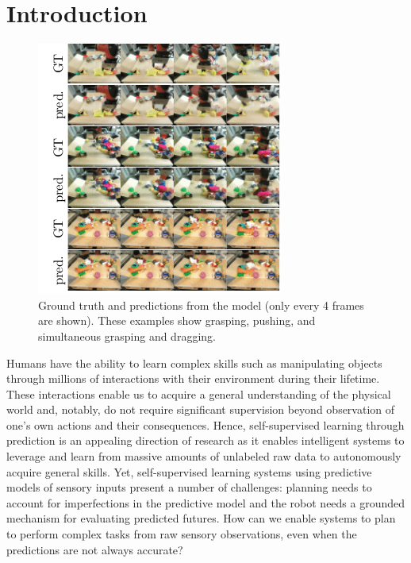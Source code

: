 \section{Introduction}

\begin{figure}
\vspace{-5mm}
\centering
\includegraphics[width=0.4\columnwidth,trim={3.2mm 0 0 0},clip]{images/video_prediction}
\caption{\small{Ground truth and predictions from the model (only every 4 frames are shown). These examples show grasping, pushing, and simultaneous grasping and dragging. }}
\label{fig:video_prediction}
\vspace{-0.2in}
\end{figure}

Humans have the ability to learn complex skills such as manipulating objects through millions of interactions with their environment during their lifetime.
These interactions enable us to acquire a general understanding of the physical world and, notably, do not require significant supervision beyond observation of one's own actions and their consequences. Hence, self-supervised learning through prediction is an appealing direction of research as it enables intelligent systems to leverage and learn from massive amounts of unlabeled raw data to autonomously acquire general skills. Yet, self-supervised learning systems using predictive models of sensory inputs present a number of challenges: planning needs to account for imperfections in the predictive model and the robot needs a grounded mechanism for evaluating predicted futures.
How can we enable systems to plan to perform complex tasks from raw sensory observations, even when the predictions are not always accurate?

